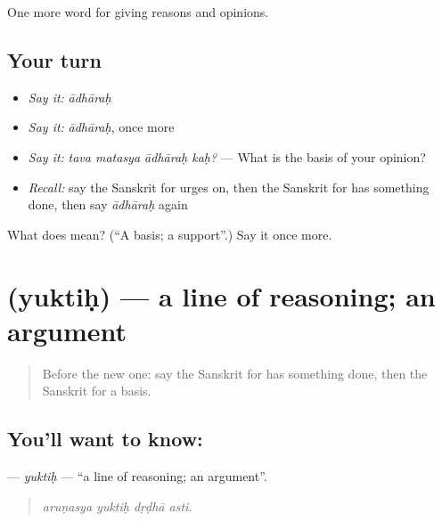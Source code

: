 \begin{grammarlens}[title={What you've built}]
One more word for giving reasons and opinions.
\end{grammarlens}

\subsection*{Your turn}
\begin{itemize}
\raggedright
  \item \emph{Say it:} \emph{ādhāraḥ}
  \item \emph{Say it:} \emph{ādhāraḥ}, once more
  \item \emph{Say it:} \emph{tava matasya ādhāraḥ kaḥ?} — What is the basis of your opinion?
  \item \emph{Recall:} say the Sanskrit for urges on, then the Sanskrit for has something done, then say \emph{ādhāraḥ} again
\end{itemize}

\begin{tcolorbox}[breakable,colback=teal!4,colframe=teal!35!black,title={Before you move on}]
What does  mean? (\textquotedblleft{}A basis; a support\textquotedblright{}.) Say it once more.
\end{tcolorbox}
\section[\texorpdfstring{\sk{युक्तिः} (yuktiḥ)}{युक्तिः (yuktiḥ)}]{ (yuktiḥ) — a line of reasoning; an argument}

\label{lesson:SA-C342-yuktih}



\begin{quote}
Before the new one: say the Sanskrit for has something done, then the Sanskrit for a basis.
\end{quote}

\subsection*{You'll want to know: }
\textbf{} — \emph{yuktiḥ} — \textquotedblleft{}a line of reasoning; an argument\textquotedblright{}.

\begin{quote}
   
\end{quote}

\begin{quote}
\emph{aruṇasya yuktiḥ dṛḍhā asti.}
\end{quote}

